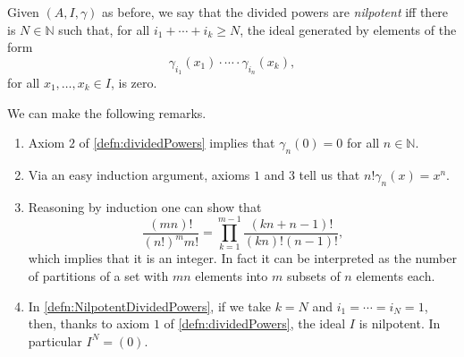 \begin{defn}\label{defn:NilpotentDividedPowers}
	Given $\left(A, I, \gamma\right)$ as before, we say that the divided
	powers are {\em nilpotent} iff there is $N \in \mathbb{N}$ such that,
	for all $i_1 + \cdots + i_k \geq N$,
	the ideal generated by elements of the form
	\begin{equation*}
		\gamma_{i_1}(x_1) \cdot \cdots \cdot \gamma_{i_n}(x_k)
	,\end{equation*}
	for all $x_1, \ldots, x_k \in I$,
	is zero.
\end{defn}


\begin{rem}[]
	We can make the following remarks.
\begin{enumerate}
\item Axiom $2$ of \cref{defn:dividedPowers}
	implies that $\gamma_n(0) = 0$ for all $n \in \mathbb{N}$.

\item Via an easy induction argument, axioms $1$ and $3$ tell us that
	$n! \gamma_n(x) = x^n$.

\item Reasoning by induction one can show that
	\begin{equation*}
		\frac{\left( mn \right)!}{\left( n! \right)^m m!} =
		\prod_{k=1}^{m-1} \frac{\left( kn + n - 1 \right)!}{(kn)! (n-1)!}
	,\end{equation*}
	which implies that it is an integer.
	In fact it can be interpreted as the number of partitions of a set with $mn$
	elements into $m$ subsets of $n$ elements each.

\item In \cref{defn:NilpotentDividedPowers},
	if we take $k = N$ and $i_1 = \cdots = i_N = 1$,
	then, thanks to axiom $1$ of \cref{defn:dividedPowers}, the ideal $I$
	is nilpotent.
	In particular $I^N = (0)$.
\end{enumerate}
\end{rem}


